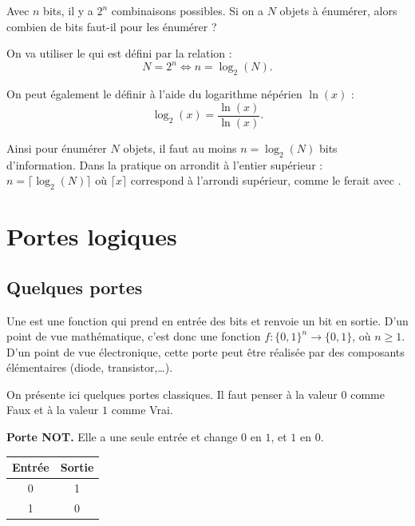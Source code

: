 \documentclass[11pt,class=report,crop=false]{standalone}
\begin{document}
Avec $n$ bits, il y a $2^n$ combinaisons possibles.
Si on a $N$ objets à énumérer, alors combien de bits faut-il pour les énumérer ?

On va utiliser le  qui est défini par la relation :
$$N = 2^n \iff n = \log_2(N).$$

On peut également le définir à l'aide du logarithme népérien $\ln(x)$ :
$$\log_2(x) = \frac{\ln(x)}{\ln(x)}.$$

Ainsi pour énumérer $N$ objets, il faut au moins $n = \log_2(N)$ bits d'information. 
Dans la pratique on arrondit à l'entier supérieur : $n = \lceil \log_2(N) \rceil$ 
où $ \lceil x \rceil$ correspond à l'arrondi supérieur, comme le ferait  avec \Python.




\section{Portes logiques}


\subsection{Quelques portes}

Une  est une fonction qui prend en entrée des bits et renvoie un bit en sortie. 
D'un point de vue mathématique, c'est donc une fonction $f : \{0,1\}^n \to \{0,1\}$, où $n\ge1$.
D'un point de vue électronique, cette porte peut être réalisée par des composants élémentaires (diode, transistor,\ldots).

On présente ici quelques portes classiques. 
Il faut penser à la valeur $0$ comme \og{}Faux\fg{} et à la valeur $1$ comme \og{}Vrai\fg{}.

\textbf{Porte NOT.}
Elle a une seule entrée et change $0$ en $1$, et $1$ en $0$.




\begin{center}
\begin{tabular}{|c|c|}
\hline
Entrée &  Sortie \\ \hline\hline
0 & 1 \\
1 & 0 \\ \hline
\end{tabular}
\end{center}
\end{document}
